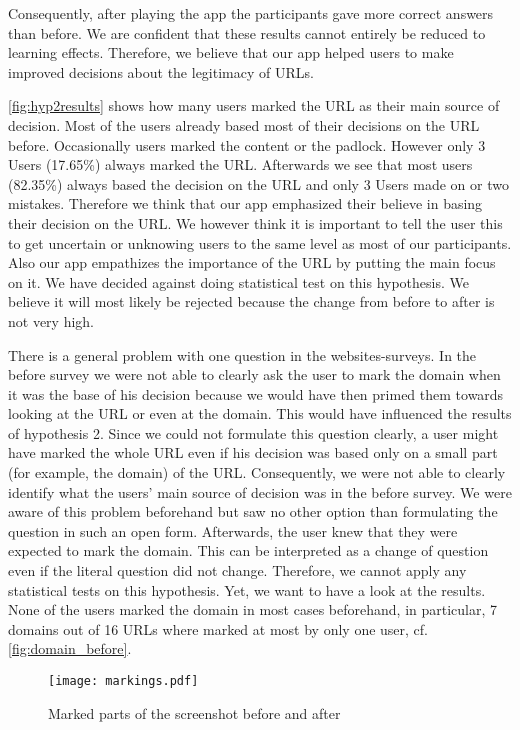 \begin{description}[leftmargin=0cm]
Consequently, after playing the app the participants gave more correct answers than before.
We are confident that these results cannot entirely be reduced to learning effects.
Therefore, we believe that our app helped users to make improved decisions about the legitimacy of URLs.
\item[Hypothesis 2:]
\autoref{fig:hyp2results} shows how many users marked the URL as their main source of decision.
Most of the users already based most of their decisions on the URL before.
Occasionally users marked the content or the padlock.
However only 3 Users (17.65\%) always marked the URL.
Afterwards we see that most users (82.35\%) always based the decision on the URL and only 3 Users made on or two mistakes.
Therefore we think that our app emphasized their believe in basing their decision on the URL.
We however think it is important to tell the user this to get uncertain or unknowing users to the same level as most of our participants.
Also our app empathizes the importance of the URL by putting the main focus on it.
We have decided against doing statistical test on this hypothesis.
We believe it will most likely be rejected because the change from before to after is not very high.
\item[Hypothesis 3:]
There is a general problem with one question in the websites-surveys.
In the before survey we were not able to clearly ask the user to mark the domain when it was the base of his decision because we would have then primed them towards looking at the URL or even at the domain.
This would have influenced the results of hypothesis 2.
Since we could not formulate this question clearly, a user might have marked the whole URL even if his decision was based only on a small part (for example, the domain) of the URL.
Consequently, we were not able to clearly identify what the users' main source of decision was in the before survey.
We were aware of this problem beforehand but saw no other option than formulating the question in such an open form.
Afterwards, the user knew that they were expected to mark the domain.
This can be interpreted as a change of question even if the literal question did not change.
Therefore, we cannot apply any statistical tests on this hypothesis.
Yet, we want to have a look at the results.
None of the users marked the domain in most cases beforehand, in particular, 7 domains out of 16 URLs where marked at most by only one user, cf. \autoref{fig:domain_before}.
\begin{figure}
\centering
\texttt{[image: markings.pdf]}
\caption{Marked parts of the screenshot before and after}
\label{fig:markings}
\end{figure}


\end{description}
